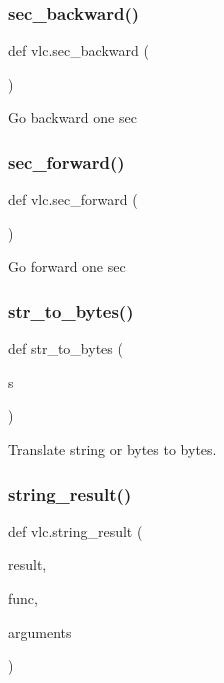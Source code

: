 \subsubsection{\texorpdfstring{sec\+\_\+backward()}{sec\_backward()}}
{\footnotesize\ttfamily def vlc.\+sec\+\_\+backward (\begin{DoxyParamCaption}{ }\end{DoxyParamCaption})}

\begin{DoxyVerb}Go backward one sec\end{DoxyVerb}
 \mbox{\label{namespacevlc_ad254a0934cc16b0efe81da452ace868b}} 
\subsubsection{\texorpdfstring{sec\+\_\+forward()}{sec\_forward()}}
{\footnotesize\ttfamily def vlc.\+sec\+\_\+forward (\begin{DoxyParamCaption}{ }\end{DoxyParamCaption})}

\begin{DoxyVerb}Go forward one sec\end{DoxyVerb}
 \mbox{\label{namespacevlc_a8cb85ab12eb35180b6cf2897d7847e46}} 
\subsubsection{\texorpdfstring{str\+\_\+to\+\_\+bytes()}{str\_to\_bytes()}}
{\footnotesize\ttfamily def str\+\_\+to\+\_\+bytes (\begin{DoxyParamCaption}\item[{}]{s }\end{DoxyParamCaption})}

\begin{DoxyVerb}Translate string or bytes to bytes.
\end{DoxyVerb}
 \mbox{\label{namespacevlc_a6b173f59be4b100a9fef397e47cbdda1}} 
\subsubsection{\texorpdfstring{string\+\_\+result()}{string\_result()}}
{\footnotesize\ttfamily def vlc.\+string\+\_\+result (\begin{DoxyParamCaption}\item[{}]{result,  }\item[{}]{func,  }\item[{}]{arguments }\end{DoxyParamCaption})}

